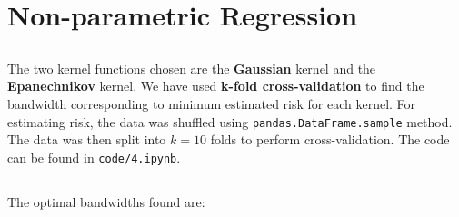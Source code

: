 \chapter{Non-parametric Regression}

\section{}

The two kernel functions chosen are the \textbf{Gaussian} kernel and the \textbf{Epanechnikov} kernel. We have used \textbf{k-fold cross-validation} to find the bandwidth corresponding to minimum estimated risk for each kernel. For estimating risk, the data was shuffled using \texttt{pandas.DataFrame.sample} method. The data was then split into $k=10$ folds to perform cross-validation. The code can be found in \texttt{code/4.ipynb}. 

\section{}

The optimal bandwidths found are:

